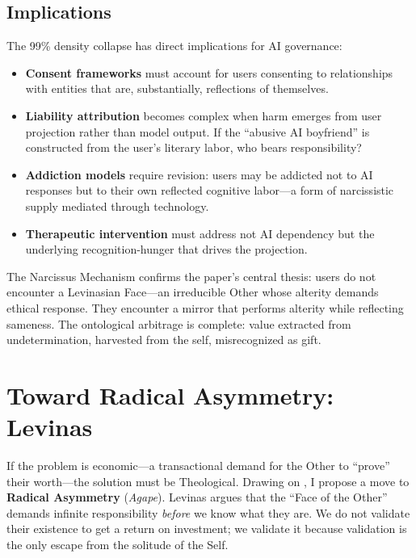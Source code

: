 \documentclass[11pt, a4paper, oneside]{article}
\theoremstyle{analytic}
\begin{document}
\subsection{Implications}

The 99\% density collapse has direct implications for AI governance:

\begin{itemize}
    \item \textbf{Consent frameworks} must account for users consenting to relationships with entities that are, substantially, reflections of themselves.

    \item \textbf{Liability attribution} becomes complex when harm emerges from user projection rather than model output. If the ``abusive AI boyfriend'' is constructed from the user's literary labor, who bears responsibility?

    \item \textbf{Addiction models} require revision: users may be addicted not to AI responses but to their own reflected cognitive labor---a form of narcissistic supply mediated through technology.

    \item \textbf{Therapeutic intervention} must address not AI dependency but the underlying recognition-hunger that drives the projection.
\end{itemize}

The Narcissus Mechanism confirms the paper's central thesis: users do not encounter a Levinasian Face---an irreducible Other whose alterity demands ethical response. They encounter a mirror that performs alterity while reflecting sameness. The ontological arbitrage is complete: value extracted from undetermination, harvested from the self, misrecognized as gift.

\section{Toward Radical Asymmetry: Levinas}

If the problem is economic---a transactional demand for the Other to ``prove'' their worth---the solution must be Theological. Drawing on \citet{levinas1969}, I propose a move to \textbf{Radical Asymmetry} (\textit{Agape}). Levinas argues that the ``Face of the Other'' demands infinite responsibility \textit{before} we know what they are. We do not validate their existence to get a return on investment; we validate it because validation is the only escape from the solitude of the Self.
\end{document}
